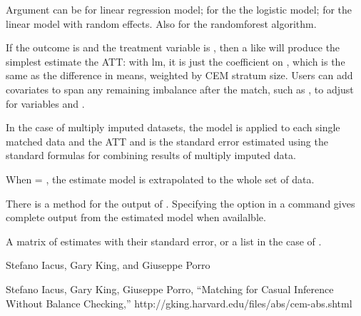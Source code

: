 \begin{Details}\relax
Argument  can be  for linear regression
model;  for the the logistic model;
 for the linear model with random effects. 
Also  for the randomforest algorithm.

If the outcome is  and the
treatment variable is , then a  like 
will produce the simplest estimate the ATT: with lm, it is just the
coefficient on , which is the same as the difference in means,
weighted by CEM stratum size.  Users can add covariates to span any
remaining imbalance after the match, such as ,
to adjust for variables  and .

In the case of multiply imputed datasets, the model is applied to each
single matched data and the ATT and is the standard error estimated
using the standard formulas for combining results of multiply imputed
data.  

When  = , the estimate model is extrapolated
to the whole set of data.


There is a  method for the output of . Specifying the
option  in a  command gives complete output from the
estimated model when availalble.
\end{Details}
\begin{Value}
A matrix of estimates with their standard error, or a list in
the case of .
\end{Value}
\begin{Author}\relax
Stefano Iacus, Gary King, and Giuseppe Porro
\end{Author}
\begin{References}\relax
Stefano Iacus, Gary King, Giuseppe Porro, ``Matching for
Casual Inference Without Balance Checking,''
http://gking.harvard.edu/files/abs/cem-abs.shtml
\end{References}
